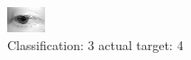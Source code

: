 \begin{figure}[h!]
\begin{center}
\includegraphics[width=0.60\columnwidth]{figures/ID2622_class_3_target_4.png}
\end{center}
\caption{ Classification: 3 actual target: 4}
\label{fig:ID2622_class_3_target_4}
\end{figure}
